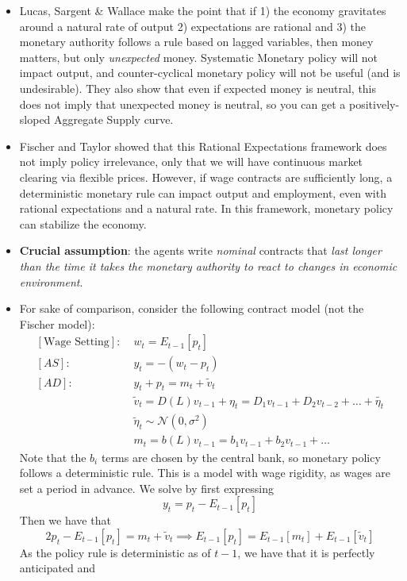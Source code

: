 \documentclass[12pt]{article}
\begin{document}
\begin{itemize}
    \item Lucas, Sargent \& Wallace make the point that if 1) the economy gravitates around a natural rate of output 2) expectations are rational and 3) the monetary authority follows a rule based on lagged variables, then money matters, but only \textit{unexpected} money. Systematic Monetary policy will not impact output, and counter-cyclical monetary policy will not be useful (and is undesirable). They also show that even if expected money is neutral, this does not imply that unexpected money is neutral, so you can get a positively-sloped Aggregate Supply curve.
    \item Fischer and Taylor showed that this Rational Expectations framework does not imply policy irrelevance, only that we will have continuous market clearing via flexible prices. However, if wage contracts are sufficiently long, a deterministic monetary rule can impact output and employment, even with rational expectations and a natural rate. In this framework, monetary policy can stabilize the economy. 
    \item \textbf{Crucial assumption}: the agents write \textit{nominal} contracts that \textit{last longer than the time it takes the monetary authority to react to changes in economic environment}.
    \item For sake of comparison, consider the following contract model (not the Fischer model):
    \[\begin{split}
        [\text{Wage Setting}]:&\; w_t = E_{t-1}[p_t] \\
        [AS]:&\; y_t = -(w_t -p_t) \\
        [AD]:&\; y_t + p_t = m_t + \widetilde{v}_t \\
        &\; \widetilde{v}_t = D(L)v_{t-1} + \eta_t = D_1v_{t-1} + D_2v_{t-2} + \hdots + \widetilde{\eta_t} \\
        &\; \widetilde{\eta}_t \sim \mathcal{N}\left(0, \sigma^2\right) \\
        &\; m_t = b(L)v_{t-1} = b_1v_{t-1} + b_2v_{t-1} + \hdots
    \end{split}\]
    Note that the $b_i$ terms are chosen by the central bank, so monetary policy follows a deterministic rule. This is a model with wage rigidity, as wages are set a period in advance. We solve by first expressing 
    \[y_t = p_t - E_{t-1}[p_t]\]
    Then we have that
    \[2p_t - E_{t-1}[p_t] = m_t + \widetilde{v}_t \implies E_{t-1}[p_t] = E_{t-1}[m_t] + E_{t-1}[\widetilde{v}_t]\]
    As the policy rule is deterministic as of $t-1$, we have that it is perfectly anticipated and

\end{itemize}
\end{document}
